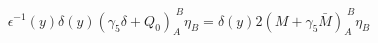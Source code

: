 \begin{equation} \label{warunkibrzeg}
  \epsilon^{-1}(y) \delta(y) (\gamma_5\delta+Q_{0})_A^{\;B}\eta_B=\delta(y)2(M+\gamma_{5}\bar{M})_A^{\;B}\eta_B
    \end{equation} 
